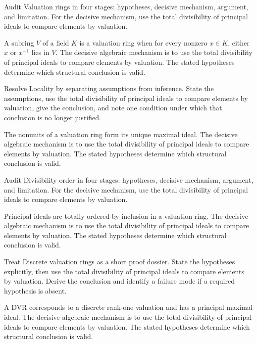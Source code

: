 \begin{problem}\label{prob:v21-problem-02}
Audit Valuation rings in four stages: hypotheses, decisive mechanism, argument, and limitation. For the decisive mechanism, use the total divisibility of principal ideals to compare elements by valuation.
\end{problem}
\begin{solution}
A subring $V$ of a field $K$ is a valuation ring when for every nonzero $x\in K$, either $x$ or $x^{-1}$ lies in $V$. The decisive algebraic mechanism is to use the total divisibility of principal ideals to compare elements by valuation. The stated hypotheses determine which structural conclusion is valid.
\end{solution}

\begin{problem}\label{prob:v21-problem-03}
Resolve Locality by separating assumptions from inference. State the assumptions, use the total divisibility of principal ideals to compare elements by valuation, give the conclusion, and note one condition under which that conclusion is no longer justified.
\end{problem}
\begin{solution}
The nonunits of a valuation ring form its unique maximal ideal. The decisive algebraic mechanism is to use the total divisibility of principal ideals to compare elements by valuation. The stated hypotheses determine which structural conclusion is valid.
\end{solution}

\begin{problem}\label{prob:v21-problem-04}
Audit Divisibility order in four stages: hypotheses, decisive mechanism, argument, and limitation. For the decisive mechanism, use the total divisibility of principal ideals to compare elements by valuation.
\end{problem}
\begin{solution}
Principal ideals are totally ordered by inclusion in a valuation ring. The decisive algebraic mechanism is to use the total divisibility of principal ideals to compare elements by valuation. The stated hypotheses determine which structural conclusion is valid.
\end{solution}

\begin{problem}\label{prob:v21-problem-05}
Treat Discrete valuation rings as a short proof dossier. State the hypotheses explicitly, then use the total divisibility of principal ideals to compare elements by valuation. Derive the conclusion and identify a failure mode if a required hypothesis is absent.
\end{problem}
\begin{solution}
A DVR corresponds to a discrete rank-one valuation and has a principal maximal ideal. The decisive algebraic mechanism is to use the total divisibility of principal ideals to compare elements by valuation. The stated hypotheses determine which structural conclusion is valid.
\end{solution}

